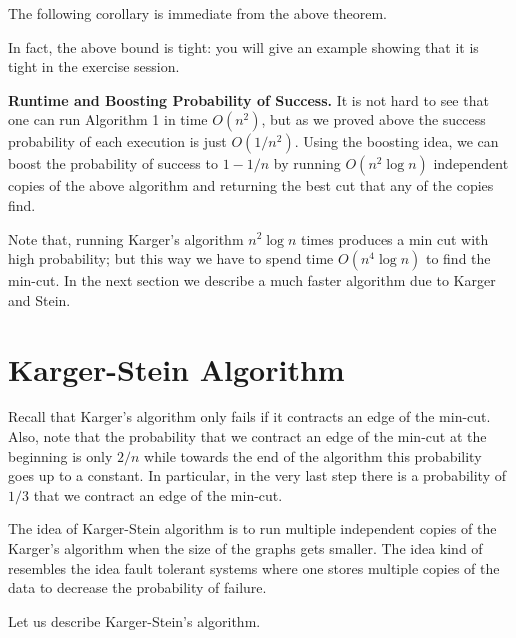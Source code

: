 The following corollary is immediate from the above theorem.



In fact, the above bound is tight: you will give an example showing that it is tight in the exercise session.

\medskip
\noindent\textbf{Runtime and Boosting Probability of Success.} It is not hard to see that one can run Algorithm 1 in time $O(n^2)$, but as we proved above the success probability of each execution is just $O(1/n^2)$. Using the boosting idea, we can boost the probability of success to $1-1/n$ by running $O(n^2\log n)$ independent copies of the above algorithm and returning the best cut that any of the copies find.

Note that, running Karger's algorithm $n^2\log n$ times produces a min cut with high probability; but this way we have to spend time $O(n^4\log n)$ to find the min-cut. In the next section we describe a much faster algorithm due to Karger and Stein.

\section{Karger-Stein Algorithm}

Recall that Karger's algorithm only fails if it contracts an edge of the min-cut. Also, note that the probability that we contract an edge of the min-cut at the beginning is only $2/n$ while towards the end of the algorithm this probability goes up to a constant. In particular, in the very last step there is a probability of $1/3$ that we contract an edge of the min-cut.

The idea of Karger-Stein algorithm is to run multiple independent copies of the Karger's algorithm when the size of the graphs gets smaller. The idea kind of resembles the idea fault tolerant systems where one stores multiple copies of the data to decrease the probability of failure.

Let us describe Karger-Stein's algorithm.

\bigskip
\noindent{}

